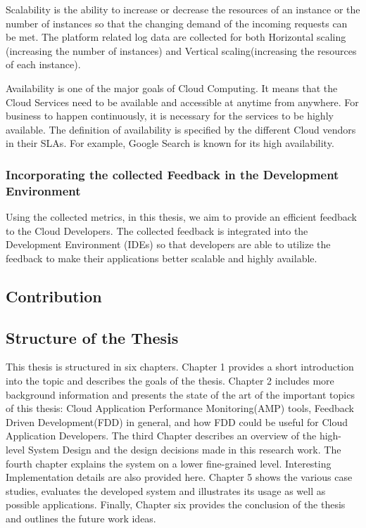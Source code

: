 \documentclass[article,type=msc,colorback,12pt,accentcolor=tud7b]{tudthesis}
\begin{document}
	\par Scalability is the ability to increase or decrease the resources of an instance or the number of instances so that the changing demand of the incoming requests can be met. The platform related log data are collected for both Horizontal scaling (increasing the number of instances) and Vertical scaling(increasing the resources of each instance).
	
	\par Availability is one of the major goals of Cloud Computing. It means that the Cloud Services need to be available and accessible at anytime from anywhere. For business to happen continuously, it is necessary for the services to be highly available. The definition of availability is specified by the different Cloud vendors in their SLAs. For example, Google Search is known for its high availability.	
	
	\subsubsection{Incorporating the collected Feedback in the Development Environment}	
	
	Using the collected metrics, in this thesis, we aim to provide an efficient feedback to the Cloud Developers. The collected feedback is integrated into the Development Environment (IDEs) so that developers are able to utilize the feedback to make their applications better scalable and highly available.	
	
	
	\subsection{Contribution}
	
	\subsection{Structure of the Thesis}

	\par This thesis is structured in six chapters. Chapter 1 provides a short introduction into the topic and describes the goals of the thesis. Chapter 2 includes more background information and presents the state of the art of the important topics of this thesis: Cloud Application Performance Monitoring(AMP) tools, Feedback Driven Development(FDD) in general, and how FDD could be useful for Cloud Application Developers. The third Chapter describes an overview of the high-level System Design and the design decisions made in this research work. The fourth chapter explains the system on a lower fine-grained level. Interesting Implementation details are also provided here. Chapter 5 shows the various case studies, evaluates the developed system and illustrates its usage as well as possible applications. Finally, Chapter six provides the conclusion of the thesis and outlines the future work ideas.
\end{document}
